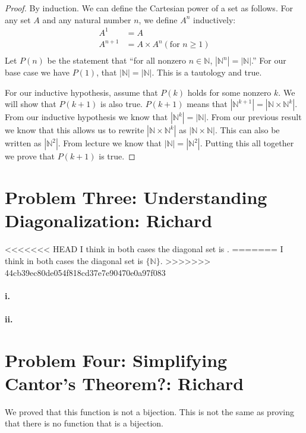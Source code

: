 \documentclass[10pt,letter]{article}
\begin{document}
\begin{proof} By induction. We can define the Cartesian power of a set as follows. For any set $A$ and any natural number $n$, we define $A^n$ inductively:
\begin{align*}
A^1 &= A \\
A^{n+1} &= A \times A^n (\text{for } n \ge 1)\\
\end{align*}
Let $P(n)$ be the statement that ``for all nonzero $n \in \mathbb{N}$, $|\mathbb{N}^n| = |\mathbb{N}|$.'' For our base case we have $P(1)$, that $|\mathbb{N}| = |\mathbb{N}|$. This is a tautology and true.

For our inductive hypothesis, assume that $P(k)$ holds for some nonzero $k$. We will show that $P(k+1)$ is also true. $P(k+1)$ means that $|\mathbb{N}^{k+1}| = |\mathbb{N} \times \mathbb{N}^k|$. From our inductive hypothesis we know that $|\mathbb{N}^k| = |\mathbb{N}|$. From our previous result we know that this allows us to rewrite $|\mathbb{N} \times \mathbb{N}^k|$ as $|\mathbb{N} \times \mathbb{N}|$. This can also be written as $|\mathbb{N}^2|$. From lecture we know that $|\mathbb{N}| = |\mathbb{N}^2|$. Putting this all together we prove that $P(k+1)$ is true.
\end{proof}


\section*{Problem Three: Understanding Diagonalization: Richard}
<<<<<<< HEAD
I think in both cases the diagonal set is .
=======
I think in both cases the diagonal set is $\{\mathbb{N}\}$.
>>>>>>> 44cb39ec80de054f818cd37e7e90470e0a97f083

\paragraph{i.} 
\paragraph{ii.}

\section*{Problem Four: Simplifying Cantor's Theorem?: Richard}
We proved that this function is not a bijection. This is not the same as proving that there is no function that is a bijection. 
\end{document}
